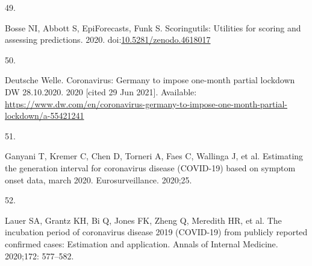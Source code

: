 \documentclass[10pt,letterpaper]{article} %
\newlength{\cslhangindent}
\newlength{\csllabelwidth}
\newlength{\cslentryspacingunit} %
\newenvironment{CSLReferences}[2] %
 {%
  \setlength{\parindent}{0pt}
  \ifodd #1
  \let\oldpar\par
  \def\par{\hangindent=\cslhangindent\oldpar}
  \fi
  \setlength{\parskip}{#2\cslentryspacingunit}
 }%
 {}
\newcommand{\CSLLeftMargin}[1]{\parbox[t]{\csllabelwidth}{#1}}
\newcommand{\CSLRightInline}[1]{\parbox[t]{\linewidth - \csllabelwidth}{#1}\break}
\providecommand{\DIFaddbegin}{} %
\providecommand{\DIFaddend}{} %
\providecommand{\DIFdelbegin}{} %
\providecommand{\DIFdelend}{} %
\newcommand{\DIFscaledelfig}{0.5}
\newlength{\DIFdelgraphicswidth} %
\newlength{\DIFdelgraphicsheight} %
\newcommand{\DIFaddincludegraphics}[2][]{{\color{blue}\fbox{\DIFOincludegraphics[#1]{#2}}}} %
\newcommand{\DIFdelincludegraphics}[2][]{%
\sbox{\DIFdelgraphicsbox}{\DIFOincludegraphics[#1]{#2}}%
\settoboxwidth{\DIFdelgraphicswidth}{\DIFdelgraphicsbox} %
\settoboxtotalheight{\DIFdelgraphicsheight}{\DIFdelgraphicsbox} %
\scalebox{\DIFscaledelfig}{%
\parbox[b]{\DIFdelgraphicswidth}{\usebox{\DIFdelgraphicsbox}\\[-\baselineskip] \rule{\DIFdelgraphicswidth}{0em}}\llap{\resizebox{\DIFdelgraphicswidth}{\DIFdelgraphicsheight}{%
\setlength{\unitlength}{\DIFdelgraphicswidth}%
\begin{picture}(1,1)%
\thicklines\linethickness{2pt} %
{\color[rgb]{1,0,0}\put(0,0){\framebox(1,1){}}}%
{\color[rgb]{1,0,0}\put(0,0){\line( 1,1){1}}}%
{\color[rgb]{1,0,0}\put(0,1){\line(1,-1){1}}}%
\end{picture}%
}\hspace*{3pt}}} %
} %
\DeclareRobustCommand{\DIFaddbegin}{\DIFOaddbegin \let\includegraphics\DIFaddincludegraphics} %
\DeclareRobustCommand{\DIFaddend}{\DIFOaddend \let\includegraphics\DIFOincludegraphics} %
\DeclareRobustCommand{\DIFdelbegin}{\DIFOdelbegin \let\includegraphics\DIFdelincludegraphics} %
\DeclareRobustCommand{\DIFdelend}{\DIFOaddend \let\includegraphics\DIFOincludegraphics} %
\begin{document}
\begin{CSLReferences}{0}{0}
\leavevmode{}%
\CSLLeftMargin{49. }
\DIFdelbegin %
\DIFdelend \DIFaddbegin \CSLRightInline{Bosse NI, Abbott S, EpiForecasts, Funk S. Scoringutils:
Utilities for scoring and assessing predictions. 2020.
doi:\href{https://doi.org/10.5281/zenodo.4618017}{10.5281/zenodo.4618017}}
\DIFaddend 

\leavevmode{}%
\CSLLeftMargin{50. }
\DIFdelbegin %
\DIFdelend \DIFaddbegin \CSLRightInline{Deutsche Welle. Coronavirus: {Germany} to impose
one-month partial lockdown \textbar{} {DW} \textbar{} 28.10.2020. 2020
{[}cited 29 Jun 2021{]}. Available:
\url{https://www.dw.com/en/coronavirus-germany-to-impose-one-month-partial-lockdown/a-55421241}}
\DIFaddend 

\leavevmode{}%
\CSLLeftMargin{51. }
\DIFdelbegin %
\DIFdelend \DIFaddbegin \CSLRightInline{Ganyani T, Kremer C, Chen D, Torneri A, Faes C, Wallinga
J, et al. Estimating the generation interval for coronavirus disease
(COVID-19) based on symptom onset data, march 2020. Eurosurveillance.
2020;25. }
\DIFaddend 

\leavevmode{}%
\CSLLeftMargin{52. }
\DIFdelbegin %
\DIFdelend \DIFaddbegin \CSLRightInline{Lauer SA, Grantz KH, Bi Q, Jones FK, Zheng Q, Meredith
HR, et al. The incubation period of coronavirus disease 2019 (COVID-19)
from publicly reported confirmed cases: Estimation and application.
Annals of Internal Medicine. 2020;172: 577--582. }
\DIFaddend 


\end{CSLReferences}
\end{document}
